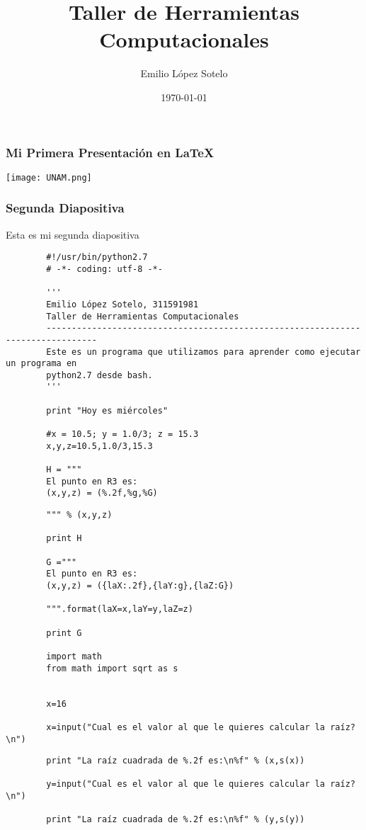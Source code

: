\documentclass{beamer}
\title{Taller de Herramientas Computacionales}
\author{Emilio López Sotelo}
\date\today
\begin{document}
	\maketitle
		\begin{frame}
		\frametitle{Mi Primera Presentación en LaTeX}
		\transdissolve
		\texttt{[image: UNAM.png]}
		\end{frame}
		\begin{frame}
		\frametitle{Segunda Diapositiva}
		Esta es mi segunda diapositiva
		\end{frame}
		\begin{frame}[fragile]
		\begin{verbatim}
		#!/usr/bin/python2.7
		# -*- coding: utf-8 -*-
		
		'''
		Emilio López Sotelo, 311591981
		Taller de Herramientas Computacionales
		--------------------------------------------------------------------------------
		Este es un programa que utilizamos para aprender como ejecutar un programa en
		python2.7 desde bash.
		'''
		
		print "Hoy es miércoles"
		
		#x = 10.5; y = 1.0/3; z = 15.3
		x,y,z=10.5,1.0/3,15.3
		
		H = """
		El punto en R3 es:
		(x,y,z) = (%.2f,%g,%G)
		\end{verbatim}
		\end{frame}
		\begin{frame}[fragile]
		\begin{verbatim}
		""" % (x,y,z)
		
		print H
		
		G ="""
		El punto en R3 es:
		(x,y,z) = ({laX:.2f},{laY:g},{laZ:G})
		
		""".format(laX=x,laY=y,laZ=z)
		
		print G
		
		import math
		from math import sqrt as s
		
		
		x=16
		
		x=input("Cual es el valor al que le quieres calcular la raíz?\n")
		\end{verbatim}
		\end{frame}
		\begin{frame}[fragile]
		\begin{verbatim}
		print "La raíz cuadrada de %.2f es:\n%f" % (x,s(x))
		
		y=input("Cual es el valor al que le quieres calcular la raíz?\n")
		
		print "La raíz cuadrada de %.2f es:\n%f" % (y,s(y))
		\end{verbatim}
		\end{frame}
\end{document}
